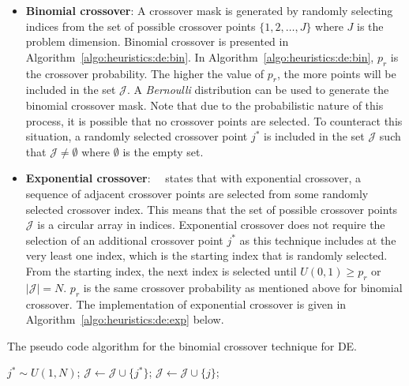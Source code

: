 \begin{itemize}
      \item \textbf{Binomial crossover}: A crossover mask is generated by randomly selecting indices from the set of possible crossover points $\{1,2,\dots,J\}$ where $J$ is the problem dimension. Binomial crossover is presented in Algorithm~\ref{algo:heuristics:de:bin}. In Algorithm~\ref{algo:heuristics:de:bin}, $p_{r}$ is the crossover probability. The higher the value of $p_{r}$, the more points will be included in the set $\mathcal{J}$. A \textit{Bernoulli} distribution can be used to generate the binomial crossover mask. Note that due to the probabilistic nature of this process, it is possible that no crossover points are selected. To counteract this situation, a randomly selected crossover point $j^{*}$ is included in the set $\mathcal{J}$ such that $\mathcal{J} \neq \emptyset$ where $\emptyset$ is the empty set.

      \item \textbf{Exponential crossover}:~\citeauthor{ref:engelbrecht:2007}~\cite{ref:engelbrecht:2007} states that with exponential crossover, a sequence of adjacent crossover points are selected from some randomly selected crossover index. This means that the set of possible crossover points $\mathcal{J}$ is a circular array in indices. Exponential crossover does not require the selection of an additional crossover point $j^{*}$ as this technique includes at the very least one index, which is the starting index that is randomly selected. From the starting index, the next index is selected until $U(0,1) \geq p_{r}$ or $|\mathcal{J}| = N$. $p_{r}$ is the same crossover probability as mentioned above for binomial crossover. The implementation of exponential crossover is given in Algorithm~\ref{algo:heuristics:de:exp} below.
\end{itemize}

\begin{algorithm}[H]
      \caption{The pseudo code algorithm for the binomial crossover technique for \acs{DE}.}
      \label{algo:heuristics:de:bin}
      \begin{algorithmic}
            \State $j^{*} \sim U(1,N)$;
            \State $\mathcal{J} \gets \mathcal{J} \cup \{j^{*}\}$;
            \State $\mathcal{J} \gets \mathcal{J} \cup \{j\}$;
            \EndIf
            \EndFor
      \end{algorithmic}
\end{algorithm}

